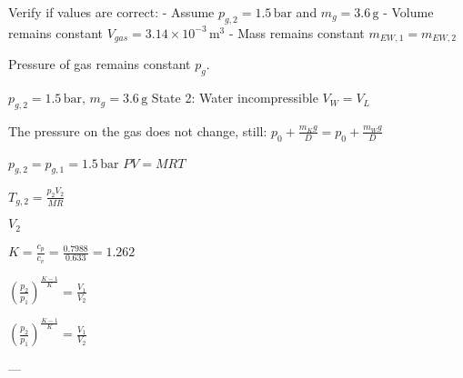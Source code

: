 Verify if values are correct:  
- Assume \( p_{g,2} = 1.5 \, \text{bar} \) and \( m_g = 3.6 \, \text{g} \)  
- Volume remains constant \( V_{gas} = 3.14 \times 10^{-3} \, \text{m}^3 \)  
- Mass remains constant \( m_{EW,1} = m_{EW,2} \)  

Pressure of gas remains constant \( p_{g} \).

\( p_{g,2} = 1.5 \, \text{bar}, \, m_g = 3.6 \, \text{g} \)  
State 2: Water incompressible  
\( V_{W} = V_{L} \)  

The pressure on the gas does not change, still:  
\( p_0 + \frac{m_K g}{D} = p_0 + \frac{m_{W} g}{D} \)  

\( p_{g,2} = p_{g,1} = 1.5 \, \text{bar} \)  
\( PV = MRT \)  

\( T_{g,2} = \frac{p_{2} V_{2}}{MR} \)  

\( V_{2} \)  

\( K = \frac{c_p}{c_v} = \frac{0.7988}{0.633} = 1.262 \)  

\( \left( \frac{p_2}{p_1} \right)^{\frac{K-1}{K}} = \frac{V_1}{V_2} \)  

\( \left( \frac{p_2}{p_1} \right)^{\frac{K-1}{K}} = \frac{V_1}{V_2} \)  

---